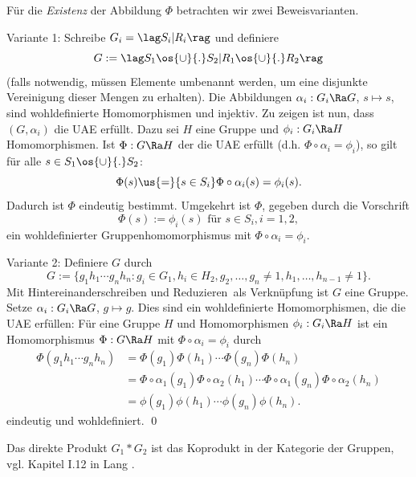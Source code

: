 Für die \textsl{Existenz} der Abbildung $\Phi$ betrachten wir zwei
Beweisvarianten.

Variante 1: Schreibe $G_i = \lag S_i|R_i \rag$ und definiere
\[
G := \lag S_1 \os{\cup}{.} S_2 | R_1 \os{\cup}{.} R_2 \rag
\]
(falls notwendig, müssen Elemente umbenannt werden, um eine
disjunkte Vereinigung dieser Mengen zu erhalten).
Die Abbildungen $\alpha_i:G_i\Ra G$, $s\mapsto s$, sind
wohldefinierte Homomorphismen und injektiv.
Zu zeigen ist nun, dass $(G,\alpha_i)$ die UAE erfüllt.
Dazu sei $H$ eine Gruppe und $\phi_i:G_i\Ra H$ Homomorphismen.
Ist $\Phi:G\Ra H$ der die UAE erfüllt
(d.h. $\Phi\circ\alpha_i=\phi_i$), so gilt für alle
$s\in S_1\os{\cup}{.} S_2$:
\[
\Phi(s) \us{=}{s\in S_i} \Phi\circ\alpha_i(s)
=\phi_i(s).
\]
Dadurch ist $\Phi$ eindeutig bestimmt.
Umgekehrt ist $\Phi$, gegeben durch die Vorschrift
\[
\Phi(s) := \phi_i(s) \text{ für } s\in S_i, i=1,2,
\]
ein wohldefinierter Gruppenhomomorphismus mit
$\Phi\circ\alpha_i=\phi_i$.

Variante 2: Definiere $G$ durch
\[
G := \{ g_1 h_1 \cdots g_n h_n : g_i\in G_1, h_i \in H_2,
g_2,\ldots,g_n\neq 1, h_1,\ldots,h_{n-1}\neq 1\}.
\]
Mit \glqq Hintereinanderschreiben und Reduzieren\grqq\ als 
Verknüpfung ist $G$ eine Gruppe.
Setze $\alpha_i:G_i\Ra G$, $g\mapsto g$.
Dies sind ein wohldefinierte Homomorphismen, die die UAE erfüllen:
Für eine Gruppe $H$ und Homomorphismen $\phi_i:G_i\Ra H$ ist
ein Homomorphismus $\Phi:G\Ra H$ mit $\Phi\circ\alpha_i=\phi_i$
durch
\begin{align*}
\Phi(g_1 h_1\cdots g_n h_n) &=
\Phi(g_1)\Phi(h_1)\cdots \Phi(g_n)\Phi(h_n) \\
&= \Phi\circ\alpha_1(g_1)\Phi\circ\alpha_2(h_1)\cdots\Phi\circ\alpha_1(g_n)\Phi\circ\alpha_2(h_n) \\
&= \phi(g_1)\phi(h_1)\cdots \phi(g_n)\phi(h_n).
\end{align*}
eindeutig und wohldefiniert.
\qed

\BEM Das direkte Produkt $G_1*G_2$ ist das Koprodukt in der Kategorie
der Gruppen, vgl. Kapitel I.12 in Lang \cite{lang}.

